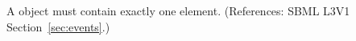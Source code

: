 A \Trigger object must contain exactly one 
element. (References: SBML L3V1 Section~\ref{sec:events}.)
